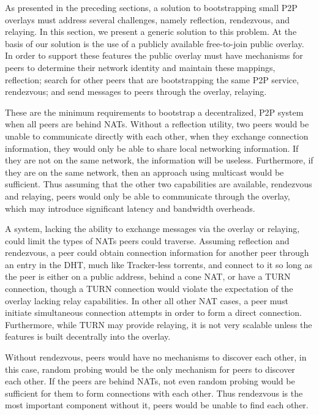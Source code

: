 \documentclass[conference]{IEEEtran}
\begin{document}
As presented in the preceding sections, a solution to bootstrapping small P2P
overlays must address several challenges, namely reflection, rendezvous, and
relaying.  In this section, we present a generic solution to this problem.  At
the basis of our solution is the use of a publicly available free-to-join
public overlay.  In order to support these features the public overlay must
have mechanisms for peers to determine their network identity and maintain
these mappings, reflection; search for other peers that are bootstrapping the
same P2P service, rendezvous; and send messages to peers through the overlay,
relaying.

These are the minimum requirements to bootstrap a decentralized, P2P system
when all peers are behind NATs.  Without a reflection utility, two peers would
be unable to communicate directly with each other, when they exchange
connection information, they would only be able to share local networking
information.  If they are not on the same network, the information will be
useless.  Furthermore, if they are on the same network, then an approach using
multicast would be sufficient.  Thus assuming that the other two capabilities
are available, rendezvous and relaying, peers would only be able to communicate
through the overlay, which may introduce significant latency and bandwidth
overheads.  

A system, lacking the ability to exchange messages via the overlay or relaying,
could limit the types of NATs peers could traverse.  Assuming reflection and
rendezvous, a peer could obtain connection information for another peer through
an entry in the DHT, much like Tracker-less torrents, and connect to it so long
as the peer is either on a public address, behind a cone NAT, or have a TURN
connection, though a TURN connection would violate the expectation of the
overlay lacking relay capabilities.  In other all other NAT cases, a peer must
initiate simultaneous connection attempts in order to form a direct
connection.  Furthermore, while TURN may provide relaying, it is not very
scalable unless the features is built decentrally into the overlay.

Without rendezvous, peers would have no mechanisms to discover each other, in
this case, random probing would be the only mechanism for peers to discover
each other.  If the peers are behind NATs, not even random probing would be
sufficient for them to form connections with each other.  Thus rendezvous is
the most important component without it, peers would be unable to find each
other.
\end{document}
